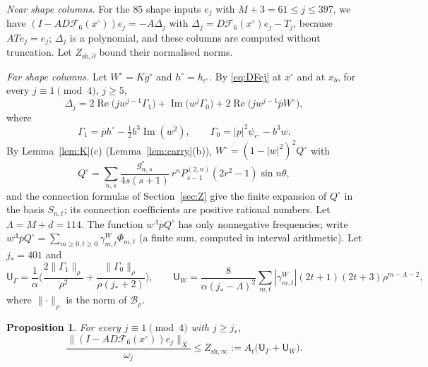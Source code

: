 \documentclass[11pt]{amsart}
\newtheorem{proposition}[theorem]{Proposition}
\theoremstyle{definition}
\theoremstyle{remark}
\numberwithin{equation}{section}
\newcommand{\Fc}{\mathcal{F}}
\newcommand{\Bc}{\mathcal{B}}
\newcommand{\jst}{j_*}
\newcommand{\sU}{\mathsf{U}}
\DeclareMathOperator{\re}{Re}
\DeclareMathOperator{\im}{Im}
\newcommand{\nrm}[1]{\lVert #1\rVert}
\begin{document}
\emph{Near shape columns.} For the $85$ shape inputs $e_j$ with $M+3=61\leq j\leq397$, we have $(I-AD\Fc_6(x^\circ))e_j=-A\Delta_j$ with $\Delta_j=D\Fc_6(x^\circ)e_j-T_j$, because $ATe_j=e_j$; $\Delta_j$ is a polynomial, and these columns are computed without truncation. Let $Z_{\mathrm{sh},\partial}$ bound their normalised norms.

\emph{Far shape columns.} Let $W^\circ=Kg^\circ$ and $h^\circ=h_{c^\circ}$. By \eqref{eq:DFej} at $x^\circ$ and at $x_b$, for every $j\equiv1\pmod4$, $j\geq5$,
\begin{equation}\label{eq:Deltaj6}
\Delta_j=2\re\big(jw^{j-1}\Gamma_1\big)+\im\big(w^j\Gamma_0\big)+2\re\big(jw^{j-1}\overline pW^\circ\big),
\end{equation}
where
\[
\Gamma_1=\overline ph^\circ-\tfrac12b^3\im(w^2),\qquad\Gamma_0=|p|^2\psi_{c^\circ}-b^3w .
\]
By Lemma~\ref{lem:K}(c) (Lemma~\ref{lem:carry}(b)), $W^\circ=(1-|w|^2)^2Q^\circ$ with
\[
Q^\circ=\sum_{n,s}\frac{g^\circ_{n,s}}{4s(s+1)}\,r^nP^{(2,n)}_{s-1}(2r^2-1)\sin n\theta ,
\]
and the connection formulas of Section~\ref{sec:Z} give the finite expansion of $Q^\circ$ in the basis $S_{n,t}$; its connection coefficients are positive rational numbers. Let $\Lambda=M+d=114$. The function $w^\Lambda\overline pQ^\circ$ has only nonnegative frequencies; write $w^\Lambda\overline pQ^\circ=\sum_{m\geq0,t\geq0}\gamma^W_{m,t}\Phi_{m,t}$ (a finite sum, computed in interval arithmetic). Let $\jst=401$ and
\[
\sU_\Gamma=\frac1\alpha\Big(\frac{2\nrm{\Gamma_1}_\rho}{\rho^2}+\frac{\nrm{\Gamma_0}_\rho}{\rho(\jst+2)}\Big),\qquad \sU_W=\frac{8}{\alpha(\jst-\Lambda)^2}\sum_{m,t}|\gamma^W_{m,t}|(2t+1)(2t+3)\rho^{m-\Lambda-2},
\]
where $\nrm\cdot_\rho$ is the norm of $\Bc_\rho$.

\begin{proposition}\label{prop:farshape6}
For every $j\equiv1\pmod4$ with $j\geq\jst$,
\[
\frac{\nrm{(I-AD\Fc_6(x^\circ))e_j}_X}{\omega_j}\leq Z_{\mathrm{sh},\infty}:=A_t\big(\sU_\Gamma+\sU_W\big).
\]
\end{proposition}
\end{document}
